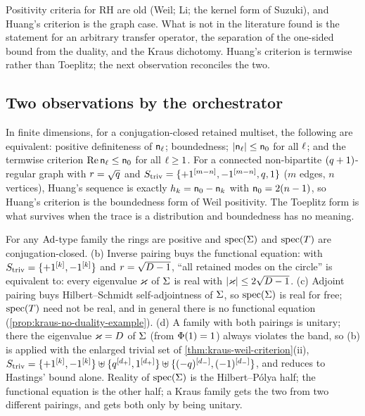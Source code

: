 Positivity criteria for RH are old (Weil; Li; the kernel form of Suzuki), and Huang's
criterion is the graph case. What is not in the literature found is the statement for an
arbitrary transfer operator, the separation of the one-sided bound from the duality, and
the Kraus dichotomy. Huang's criterion is termwise rather than Toeplitz; the next
observation reconciles the two.

\subsection{Two observations by the orchestrator}

\begin{observation}
\label{obs:huang-boundedness}
In finite dimensions, for a conjugation-closed retained multiset, the following are
equivalent: positive definiteness of $\mathsf n_{\ell}$; boundedness; $|\mathsf n_{\ell}|\le\mathsf n_{0}$
for all $\ell$; and the termwise criterion $\operatorname{Re}\mathsf n_{\ell}\le\mathsf n_{0}$ for all $\ell\ge1$.
For a connected non-bipartite $(q+1)$-regular graph with $r = \sqrt{q}$ and
$S_{\mathrm{triv}} = \{+1^{[m-n]},-1^{[m-n]},q,1\}$ ($m$ edges, $n$ vertices), Huang's sequence is
exactly $h_k = \mathsf n_{0}-\mathsf n_{k}$ with $\mathsf n_{0} = 2(n-1)$, so Huang's criterion is the
boundedness form of Weil positivity. The Toeplitz form is what survives when the trace is
a distribution and boundedness has no meaning.
\end{observation}

\begin{observation}
\label{obs:kraus-dichotomy}
For any $\operatorname{Ad}$-type family the rings are positive and $\operatorname{spec}(\Sigma)$ and
$\operatorname{spec}(T)$ are conjugation-closed. (b) Inverse pairing buys the functional
equation: with $S_{\mathrm{triv}} = \{+1^{[k]},-1^{[k]}\}$ and $r = \sqrt{D-1}$, ``all retained
modes on the circle'' is equivalent to: every eigenvalue $\varkappa$ of $\Sigma$ is real with
$|\varkappa|\le2\sqrt{D-1}$. (c) Adjoint pairing buys Hilbert--Schmidt self-adjointness of
$\Sigma$, so $\operatorname{spec}(\Sigma)$ is real for free; $\operatorname{spec}(T)$ need
not be real, and in general there is no functional equation
(\cref{prop:kraus-no-duality-example}). (d) A family with both pairings is unitary; there
the eigenvalue $\varkappa = D$ of $\Sigma$ (from $\Phi(1) = 1$) always violates the band, so
(b) is applied with the enlarged trivial set of \cref{thm:kraus-weil-criterion}(ii),
$S_{\mathrm{triv}} = \{+1^{[k]},-1^{[k]}\}\uplus\{q^{[d_+]},1^{[d_+]}\}\uplus\{(-q)^{[d_-]},(-1)^{[d_-]}\}$,
and reduces to Hastings' bound alone. Reality of $\operatorname{spec}(\Sigma)$ is the
Hilbert--P\'olya half; the functional equation is the other half; a Kraus family gets the
two from two different pairings, and gets both only by being unitary.
\end{observation}

